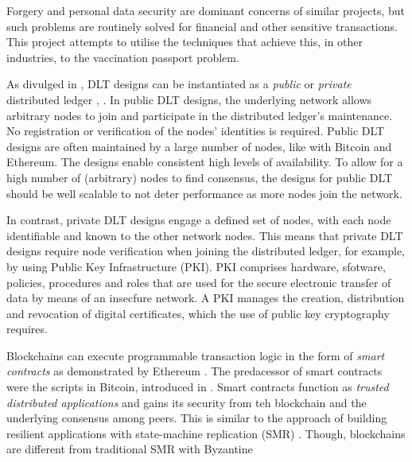 Forgery and personal data security are dominant concerns of similar projects, but such problems are routinely solved for financial and other sensitive transactions. \cite{dye_covid-19_2021}
This project attempts to utilise the techniques that achieve this, in other industries, to the vaccination passport problem. %

As divulged in \cite{sunyaev_distributed_2020}, DLT designs can be instantiated as a \emph{public} or \emph{private} distributed ledger \cite{yeow_decentralized_2018}, \cite{xu_taxonomy_2017}.
In public DLT designs, the underlying network allows arbitrary nodes to join and participate in the distributed ledger's maintenance. No registration or verification of the nodes' identities is required.
Public DLT designs are often maintained by a large number of nodes, like with Bitcoin and Ethereum. The designs enable consistent high levels of availability. 
To allow for a high number of (arbitrary) nodes to find consensus, the designs for public DLT should be well scalable to not deter performance as more nodes join the network. \cite{sunyaev_distributed_2020}

In contrast, private DLT designs engage a defined set of nodes, with each node identifiable and known to the other network nodes. This means that private DLT designs require node verification when joining the distributed ledger, for example, by using Public Key Infrastructure (PKI).
PKI comprises hardware, sfotware, policies, procedures and roles that are used for the secure electronic transfer of data by means of an insecfure network. A PKI manages the creation, distribution and revocation of digital certificates, which the use of public key cryptography requires. \cite{sunyaev_distributed_2020}

Blockchains can execute programmable transaction logic in the form of \emph{smart contracts} as demonstrated by Ethereum \cite{noauthor_ethereum_nodate}.
The predacessor of smart contracts were the scripts in Bitcoin, introduced in \cite{nakamoto_bitcoin_2019}.
Smart contracts function as \emph{trusted distributed applications} and gains its security from teh blockchain and the underlying consensus among peers.
This is similar to the approach of building resilient applications with state-machine replication (SMR) \cite{schneider_implementing_1990}.
Though, blockchains are different from traditional SMR with Byzantine 
